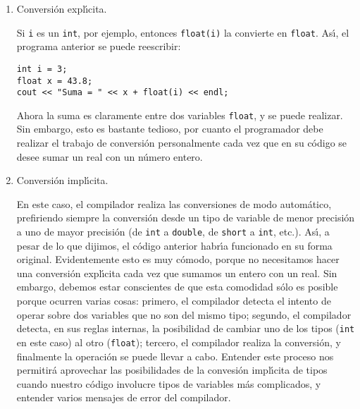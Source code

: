 \begin{enumerate}
\item[a)] Conversi{\'o}n expl{\'\i}cita.

Si \verb+i+ es un  \verb+int+, por ejemplo, 
entonces \verb+float(i)+ la convierte en \verb+float+. As\'{\i}, el
programa anterior se puede reescribir:
\begin{verbatim}
int i = 3;
float x = 43.8;
cout << "Suma = " << x + float(i) << endl;
\end{verbatim}
Ahora la suma es claramente entre dos variables \verb+float+, y se
puede realizar. Sin embargo, 
esto es bastante tedioso, por cuanto el programador debe realizar el
trabajo de conversi{\'o}n personalmente cada vez que en su c\'odigo se
desee sumar un real con un n\'umero entero.

\item[b)] Conversi{\'o}n impl{\'\i}cita.
  
En este caso, el compilador realiza las conversiones de modo
autom{\'a}tico, prefiriendo siempre la conversi{\'o}n desde un tipo
de variable de menor precisi{\'o}n a uno de mayor precisi{\'o}n (de
\verb+int+ a \verb+double+, de \verb+short+ a \verb+int+, etc.).
As\'{\i}, a pesar de lo que dijimos, el c\'odigo anterior
habr\'{\i}a funcionado en su forma original. Evidentemente esto es muy
c\'omodo, porque no necesitamos hacer una conversi\'on expl\'{\i}cita
cada vez que sumamos un entero con un real. Sin embargo, debemos estar
conscientes de que esta comodidad s\'olo es posible porque ocurren
varias cosas: primero, el compilador detecta el intento de operar
sobre dos variables que no son del mismo tipo; segundo, el compilador
detecta, en sus reglas internas, la posibilidad de cambiar uno de los
tipos ({\tt int} en este caso) al otro ({\tt float}); tercero, el
compilador realiza la conversi\'on, y finalmente la operaci\'on se
puede llevar a cabo. Entender este proceso nos permitir\'a aprovechar
las posibilidades de la convesi\'on impl\'{\i}cita de tipos cuando
nuestro c\'odigo involucre tipos de variables m\'as complicados, y
entender varios mensajes de error del compilador.



\end{enumerate}
